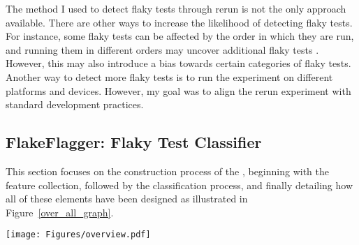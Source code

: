 The method I used to detect flaky tests through rerun is not the only approach available. There are other ways to increase the likelihood of detecting flaky tests. For instance, some flaky tests can be affected by the order in which they are run, and running them in different orders may uncover additional flaky tests \cite{lam2019idflakies}. However, this may also introduce a bias towards certain categories of flaky tests. Another way to detect more flaky tests is to run the experiment on different platforms and devices. However, my goal was to align the rerun experiment with standard development practices.


\subsection{FlakeFlagger: Flaky Test Classifier}
\label{sec:flakeFlaggerClassifier}

This section focuses on the construction process of the \sysName, beginning with the feature collection, followed by the classification process, and finally detailing how all of these elements have been designed as illustrated in Figure~\ref{over_all_graph}.


\begin{figure*}[t]
  \texttt{[image: Figures/overview.pdf]}
  \centering
  \vspace{-5pt}
  \caption{Overview of \sysName's approach to predict likely flaky tests.}
  \vspace{-15pt}
  \label{over_all_graph}
\end{figure*}
\vspace{-5pt}





